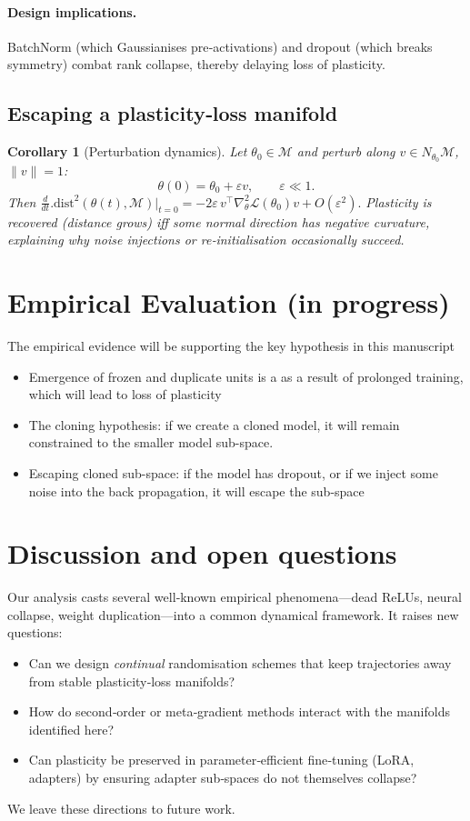\documentclass{article}
\newcommand{\Loss}{\mathcal{L}}
\newtheorem{corollary}{Corollary}[section]
\begin{document}
\paragraph{Design implications.}
BatchNorm (which Gaussianises pre‑activations) and dropout (which breaks symmetry) combat rank collapse, thereby delaying loss of plasticity.

\subsection{Escaping a plasticity‑loss manifold}

\begin{corollary}[Perturbation dynamics]
\label{cor:perturb}
Let $\theta_0\in\mathcal{M}$ and perturb along $v\in N_{\theta_0}\mathcal{M}$, $\|v\|=1$:
\[
\theta(0)=\theta_0+\varepsilon v,\qquad \varepsilon\ll1.
\]
Then
\(
\frac{d}{dt}\bigl.\mathrm{dist}^2(\theta(t),\mathcal{M})\bigr|_{t=0}
=-2\varepsilon\,v^\top\nabla_\theta^2\Loss(\theta_0)v+O(\varepsilon^2).
\)
Plasticity is recovered (distance grows) iff some normal direction has negative curvature, explaining why noise injections or re‑initialisation occasionally succeed.
\end{corollary}

\section{Empirical Evaluation (in progress)}
\label{sec:experiments}

The empirical evidence will be supporting the key hypothesis in this manuscript 
\begin{itemize}
    \item Emergence of frozen and duplicate units is a as a result of prolonged training, which will lead  to loss of plasticity 
    \item The cloning hypothesis: if we create a cloned model, it will remain constrained to the smaller model sub-space.
    \item Escaping cloned sub-space: if the model has dropout, or if we inject some noise into the back propagation, it will escape the sub-space 
\end{itemize}

\section{Discussion and open questions}
Our analysis casts several well‑known empirical phenomena—dead ReLUs, neural collapse, weight duplication—into a common dynamical framework. It raises new questions:
\begin{itemize}[nosep]
    \item Can we design \emph{continual} randomisation schemes that keep trajectories away from stable plasticity‑loss manifolds?
    \item How do second‑order or meta‑gradient methods interact with the manifolds identified here?
    \item Can plasticity be preserved in parameter‑efficient fine‑tuning (LoRA, adapters) by ensuring adapter sub‑spaces do not themselves collapse?
\end{itemize}
We leave these directions to future work.
\end{document}
